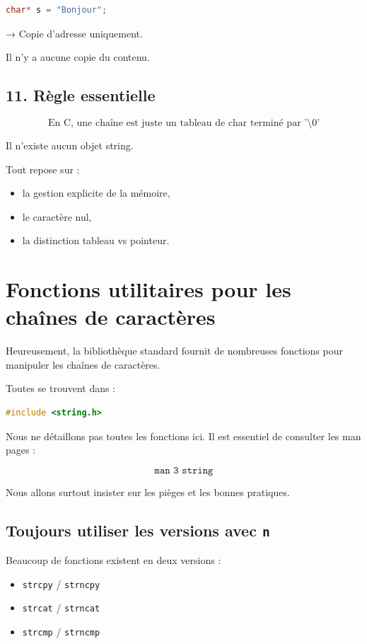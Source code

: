 \begin{lstlisting}[language=C]
char* s = "Bonjour";
\end{lstlisting}

→ Copie d’adresse uniquement.

Il n’y a aucune copie du contenu.

\subsection{11. Règle essentielle}

\[
\boxed{
\text{En C, une chaîne est juste un tableau de char terminé par '\textbackslash 0'}
}
\]

Il n’existe aucun objet string.

Tout repose sur :

\begin{itemize}
\item la gestion explicite de la mémoire,
\item le caractère nul,
\item la distinction tableau vs pointeur.
\end{itemize}

\section{Fonctions utilitaires pour les chaînes de caractères}

Heureusement, la bibliothèque standard fournit de nombreuses fonctions
pour manipuler les chaînes de caractères.

Toutes se trouvent dans :

\begin{lstlisting}[language=C]
#include <string.h>
\end{lstlisting}

Nous ne détaillons pas toutes les fonctions ici.
Il est essentiel de consulter les man pages :

\[
\boxed{\texttt{man 3 string}}
\]

Nous allons surtout insister sur les pièges et les bonnes pratiques.

\subsection{Toujours utiliser les versions avec \texttt{n}}

Beaucoup de fonctions existent en deux versions :

\begin{itemize}
    \item \texttt{strcpy} / \texttt{strncpy}
    \item \texttt{strcat} / \texttt{strncat}
    \item \texttt{strcmp} / \texttt{strncmp}
\end{itemize}

